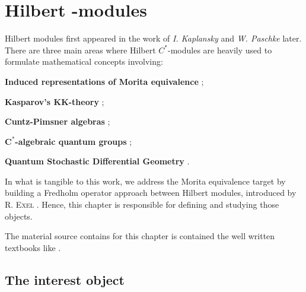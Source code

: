 \chapter[Hilbert \texorpdfstring{\ensuremath{C^*}}{C*}-modules]{Hilbert \texorpdfstring{}{C*}-modules}
\label{ch:hilbert modules}

Hilbert modules first appeared in the work of \textit{I. Kaplansky} \cite{kaplansky1953modules} and \textit{W. Paschke} \cite{paschke1973inner} later. There are three main areas where Hilbert $C^*$-modules are heavily used to formulate mathematical concepts involving:
\begin{itroman}
    \item\label{main areas (i)} \textbf{Induced representations of Morita equivalence} \cite{brown1977stable, RIEFFEL1974176,rieffel1981c};
    \item \textbf{Kasparov's $\mathbf{KK}$-theory} \cite{kasparov1980stinespring};
    
    \item \textbf{Cuntz-Pimsner algebras} \cite{Schafhauser2015CuntzPimsner, robertson2011extensions, browlowe2004exel}; %
    \item \textbf{$\mathbf{C^*}$-algebraic quantum groups} \cite{woronowicz1991unbounded, abadie1996hilbert};
    \item \textbf{Quantum Stochastic Differential Geometry} \cite{applebaum1988quantum}.
\end{itroman}

In what is tangible to this work, we address the Morita equivalence target by building a Fredholm operator approach between Hilbert modules, introduced by \textsc{R. Exel} \cite{exel7fredholm}. Hence, this chapter is responsible for defining and studying those objects.

The material source contains for this chapter is contained the well written textbooks like \cite{lance1995hilbert,jensen2012elements, manuilov2001hilbert}.

\section{The interest object}
\label{sec:definicao de hilbert c-star-modules}

